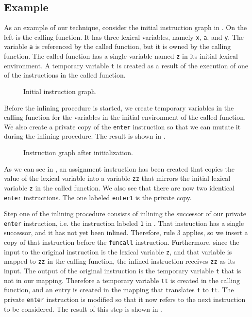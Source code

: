 \subsection{Example}

As an example of our technique, consider the initial instruction graph
in .  On the left is the calling function.  It has three
lexical variables, namely \texttt{x}, \texttt{a}, and \texttt{y}.  The
variable \texttt{a} is referenced by the called function, but it is
owned by the calling function.  The called function has a single
variable named \texttt{z} in its initial lexical environment.  A
temporary variable \texttt{t} is created as a result of the execution
of one of the instructions in the called function.

\begin{figure}
\begin{center}
\end{center}
\caption{\label{fig41}
Initial instruction graph.}
\end{figure}

Before the inlining procedure is started, we create temporary
variables in the calling function for the variables in the initial
environment of the called function.  We also create a private copy of
the \texttt{enter} instruction so that we can mutate it during the
inlining procedure.  The result is shown in .

\begin{figure}
\begin{center}
\end{center}
\caption{\label{fig42}
Instruction graph after initialization.}
\end{figure}

As we can see in , an assignment instruction has been
created that copies the value of the lexical variable into a variable
\texttt{zz} that mirrors the initial lexical variable \texttt{z} in
the called function.  We also see that there are now two identical
\texttt{enter} instructions.  The one labeled \texttt{enter1} is the
private copy.

Step one of the inlining procedure consists of inlining the successor
of our private \texttt{enter} instruction, i.e. the instruction
labeled \texttt{1} in .  That instruction has a single
successor, and it has not yet been inlined.  Therefore, rule 3
applies, so we insert a copy of that instruction before the
\texttt{funcall} instruction.  Furthermore, since the input to the
original instruction is the lexical variable \texttt{z}, and that
variable is mapped to \texttt{zz} in the calling function, the inlined
instruction receives \texttt{zz} as its input.  The output of the
original instruction is the temporary variable \texttt{t} that is not
in our mapping.  Therefore a temporary variable \texttt{tt} is created
in the calling function, and an entry is created in the mapping that
translates \texttt{t} to \texttt{tt}.  The private \texttt{enter}
instruction is modified so that it now refers to the next instruction
to be considered.  The result of this step is shown in .

